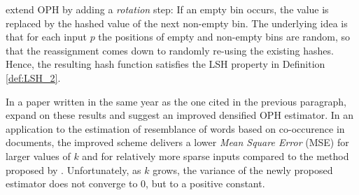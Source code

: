 \cite{Shrivastava014densified} extend OPH by adding a \textit{rotation} step: If an empty bin occurs, the value is replaced by the hashed value of the next non-empty bin.
The underlying idea is that for each input $p$ the positions of empty and non-empty bins are random, so that the reassignment comes down to randomly re-using the existing hashes. Hence, the resulting hash function satisfies the LSH property in Definition \ref{def:LSH_2}. 

In a paper written in the same year as the one cited in the previous paragraph, \cite{Shrivastava014Improved} expand on these results and suggest an improved densified OPH estimator. %
In an application to the estimation of resemblance of words based on co-occurence in documents, the improved scheme delivers a lower \textit{Mean Square Error} (MSE) for larger values of $k$ and for relatively more sparse inputs compared to the method proposed by \cite{Shrivastava014densified}. Unfortunately, as $k$ grows, the variance of the newly proposed estimator does not converge to $0$, but to a positive constant. 


